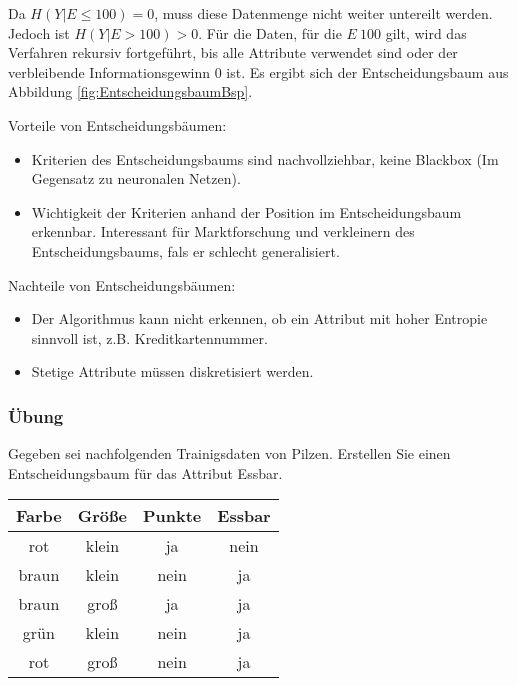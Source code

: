 Da \(H(Y|E \leq 100) = 0\), muss diese Datenmenge nicht weiter untereilt werden.
Jedoch ist \(H(Y|E > 100) > 0\).
Für die Daten, für die \(E \> 100\) gilt, wird das Verfahren rekursiv fortgeführt, bis alle Attribute verwendet sind oder der verbleibende Informationsgewinn 0 ist.
Es ergibt sich der Entscheidungsbaum aus Abbildung \ref{fig:EntscheidungsbaumBsp}.

Vorteile von Entscheidungsbäumen:
\begin{itemize}
	\item Kriterien des Entscheidungsbaums sind nachvollziehbar, keine Blackbox (Im Gegensatz zu neuronalen Netzen). 
	\item Wichtigkeit der Kriterien anhand der Position im Entscheidungsbaum erkennbar.
		Interessant für Marktforschung und verkleinern des Entscheidungsbaums, fals er schlecht generalisiert.
\end{itemize}
Nachteile von Entscheidungsbäumen:
\begin{itemize}
	\item Der Algorithmus kann nicht erkennen, ob ein Attribut mit hoher Entropie sinnvoll ist, z.B. Kreditkartennummer.
	\item Stetige Attribute müssen diskretisiert werden.
\end{itemize}

\subsubsection{Übung}
Gegeben sei nachfolgenden Trainigsdaten von Pilzen.
Erstellen Sie einen Entscheidungsbaum für das Attribut Essbar.
\begin{table}[htbp]
	\centering
	\begin{tabular}{cccc}
		\toprule
		\textbf{Farbe} & \textbf{Größe} & \textbf{Punkte} & \textbf{Essbar}	\\
		\midrule
		rot & klein & ja & nein\\
		braun & klein & nein & ja\\
		braun & groß & ja & ja\\
		grün & klein & nein & ja\\
		rot & groß & nein & ja	\\
		\bottomrule
	\end{tabular}
\end{table}

